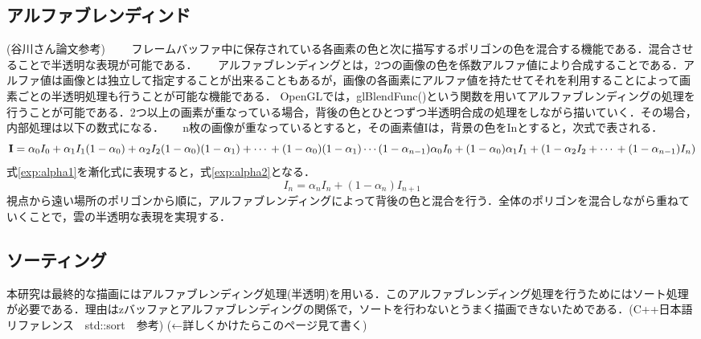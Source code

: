 \documentclass[11pt]{jreport}
\begin{document}
\subsection{アルファブレンディンド}
(谷川さん論文参考)
　　フレームバッファ中に保存されている各画素の色と次に描写するポリゴンの色を混合する機能である．混合させることで半透明な表現が可能である．　
　アルファブレンディングとは，2つの画像の色を係数アルファ値により合成することである．アルファ値は画像とは独立して指定することが出来ることもあるが，画像の各画素にアルファ値を持たせてそれを利用することによって画素ごとの半透明処理も行うことが可能な機能である．
 OpenGLでは，glBlendFunc()という関数を用いてアルファブレンディングの処理を行うことが可能である．2つ以上の画素が重なっている場合，背後の色とひとつずつ半透明合成の処理をしながら描いていく．その場合，内部処理は以下の数式になる．
　 n枚の画像が重なっているとすると，その画素値Iは，背景の色をInとすると，次式で表される．
\begin{equation}
   {\bf I} =\alpha_{0}I_{0}+\alpha_{1}I_{1}(1-\alpha_{0})+\alpha_{2}I_{2}(1-\alpha_{0})(1-\alpha_{1})+\cdots \\
+(1-\alpha_{0})(1-\alpha_{1})\cdots(1-\alpha_{n-1})\alpha_{0}I_{0}+(1-\alpha_{0}){\alpha_{1}I_{1}+(1-\alpha_{2}I_{2}+\cdots \\
+(1-\alpha_{n-1})I_{n})} \label{exp:alpha1}
\end{equation}
式\ref{exp:alpha1}を漸化式に表現すると，式\ref{exp:alpha2}となる．
\begin{equation}
 I_{n} = \alpha_{n}I_{n}+(1-\alpha_{n})I_{n+1}\label{exp:alpha2}
\end{equation}
視点から遠い場所のポリゴンから順に，アルファブレンディングによって背後の色と混合を行う．全体のポリゴンを混合しながら重ねていくことで，雲の半透明な表現を実現する．

\subsection{ソーティング}
本研究は最終的な描画にはアルファブレンディング処理(半透明)を用いる．このアルファブレンディング処理を行うためにはソート処理が必要である．理由はzバッファとアルファブレンディングの関係で，ソートを行わないとうまく描画できないためである．(C++日本語リファレンス　std::sort　参考)
(←詳しくかけたらこのページ見て書く)
\end{document}
